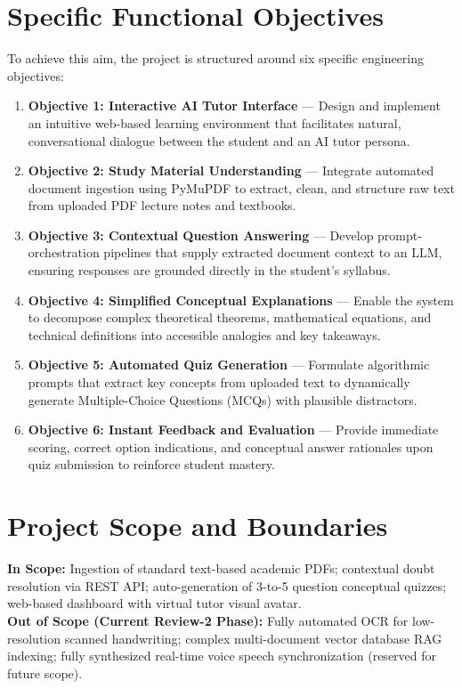 \documentclass[11pt,a4paper]{report}
\begin{document}
\section{Specific Functional Objectives}
To achieve this aim, the project is structured around six specific engineering objectives:
\begin{enumerate}[topsep=2pt, itemsep=4pt]
    \item \textbf{Objective 1: Interactive AI Tutor Interface} --- Design and implement an intuitive web-based learning environment that facilitates natural, conversational dialogue between the student and an AI tutor persona.
    \item \textbf{Objective 2: Study Material Understanding} --- Integrate automated document ingestion using PyMuPDF to extract, clean, and structure raw text from uploaded PDF lecture notes and textbooks.
    \item \textbf{Objective 3: Contextual Question Answering} --- Develop prompt-orchestration pipelines that supply extracted document context to an LLM, ensuring responses are grounded directly in the student's syllabus.
    \item \textbf{Objective 4: Simplified Conceptual Explanations} --- Enable the system to decompose complex theoretical theorems, mathematical equations, and technical definitions into accessible analogies and key takeaways.
    \item \textbf{Objective 5: Automated Quiz Generation} --- Formulate algorithmic prompts that extract key concepts from uploaded text to dynamically generate Multiple-Choice Questions (MCQs) with plausible distractors.
    \item \textbf{Objective 6: Instant Feedback and Evaluation} --- Provide immediate scoring, correct option indications, and conceptual answer rationales upon quiz submission to reinforce student mastery.
\end{enumerate}

\section{Project Scope and Boundaries}
\textbf{In Scope:} Ingestion of standard text-based academic PDFs; contextual doubt resolution via REST API; auto-generation of 3-to-5 question conceptual quizzes; web-based dashboard with virtual tutor visual avatar.\\
\textbf{Out of Scope (Current Review-2 Phase):} Fully automated OCR for low-resolution scanned handwriting; complex multi-document vector database RAG indexing; fully synthesized real-time voice speech synchronization (reserved for future scope).
\clearpage
\end{document}
